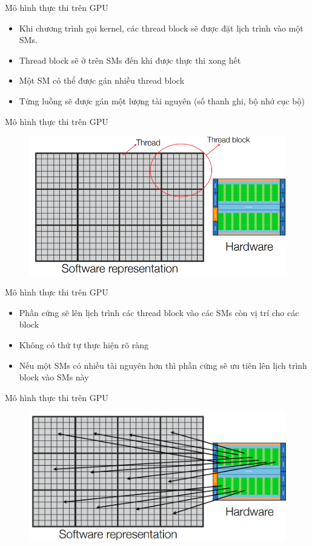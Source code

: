 \documentclass[10pt]{beamer}
\theoremstyle{remark}
\numberwithin{algocf}{section}
\numberwithin{equation}{section}
\numberwithin{dl}{section}
\numberwithin{figure}{section}
\begin{document}
\begin{frame}{Mô hình thực thi trên GPU}
    \begin{itemize}
        \item Khi chương trình gọi kernel, các thread block sẽ được đặt lịch trình vào một SMs.
        \item Thread block sẽ ở trên SMs đến khi được thực thi xong hết
        \item Một SM có thể được gán nhiều thread block
        \item Từng luồng sẽ được gán một lượng tài nguyên (số thanh ghi, bộ nhớ cục bộ)
    \end{itemize}
\end{frame}

\begin{frame}{Mô hình thực thi trên GPU}
    \begin{figure}[H]
        \centering
        \includegraphics[width=0.85\linewidth]{figures/CUDA/Connecting_SW_HW_1.png}
    \end{figure}
\end{frame}

\begin{frame}{Mô hình thực thi trên GPU}
    \begin{itemize}
        \item Phần cứng sẽ lên lịch trình các thread block vào các SMs còn vị trí cho các block 
        \item Không có thứ tự thực hiện rõ ràng
        \item Nếu một SMs có nhiều tài nguyên hơn thì phần cứng sẽ ưu tiên lên lịch trình block vào SMs này
    \end{itemize}
\end{frame}

\begin{frame}{Mô hình thực thi trên GPU}
    \begin{figure}[H]
        \centering
        \includegraphics[width=0.85\linewidth]{figures/CUDA/Connecting_SW_HW_2.png}
    \end{figure}
\end{frame}
\end{document}
